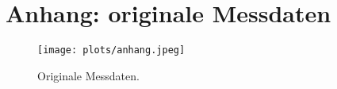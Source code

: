 \section*{Anhang: originale Messdaten}
\label{sec:Anhang}
\begin{figure}
    \centering
    \texttt{[image: plots/anhang.jpeg]}
    \caption{Originale Messdaten.}
    \label{fig:orig}
\end{figure}